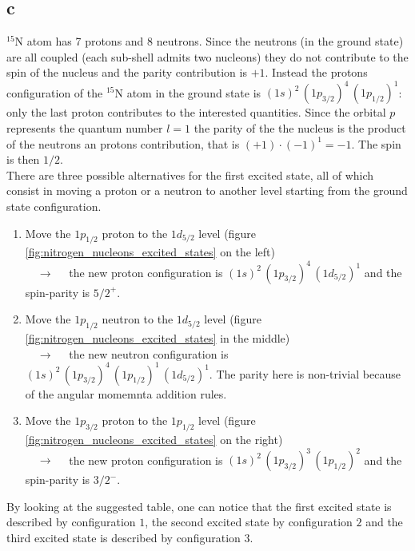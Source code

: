 \subsection*{c}
$^{15}$N atom has 7 protons and 8 neutrons. Since the neutrons (in the ground state) are all coupled (each sub-shell admits two nucleons) they do not contribute to  the spin of the nucleus and the parity contribution is $+1$. Instead the protons configuration
of the $^{15}$N atom in the ground state is $(1s)^2 \, (1p_{3/2})^4 \, (1p_{1/2})^1$: only the last proton contributes to the interested quantities. Since the orbital $p$ represents the quantum number $l=1$ the parity of the the nucleus is the product of the neutrons 
an protons contribution, that is $(+1) \cdot (-1)^1 = -1$. The spin is then $1/2$. \\ \newpage
There are three possible alternatives for the first excited state, all of which consist in moving a proton or a neutron to another level starting from the ground state configuration.
\begin{enumerate}
    \item Move the $1p_{1/2}$ proton to the $1d_{5/2}$ level (figure \ref{fig:nitrogen_nucleons_excited_states} on the left) \\ $\quad \longrightarrow \quad$ the new proton configuration is $(1s)^2 \, (1p_{3/2})^4  \, (1d_{5/2})^1$ and the spin-parity is $5/2^+$.
    \item Move the $1p_{1/2}$ neutron to the $1d_{5/2}$ level (figure \ref{fig:nitrogen_nucleons_excited_states} in the middle) \\ $\quad \longrightarrow \quad $ the new neutron configuration is $(1s)^2 \, (1p_{3/2})^4 \, (1p_{1/2})^{1} \, (1d_{5/2})^1$. The parity here is non-trivial because of the angular momemnta addition rules.
    \item Move the $1p_{3/2}$ proton to the $1p_{1/2}$ level (figure \ref{fig:nitrogen_nucleons_excited_states} on the right)\\ $\quad \longrightarrow \quad$ the new proton configuration is $(1s)^2 \, (1p_{3/2})^{3} \, (1p_{1/2})^2$ and the spin-parity is $3/2^-$.
\end{enumerate}
By looking at the suggested table, one can notice that the first excited state is described by configuration $1$, the second excited state by configuration $2$ and the third excited state is described by configuration $3$.


